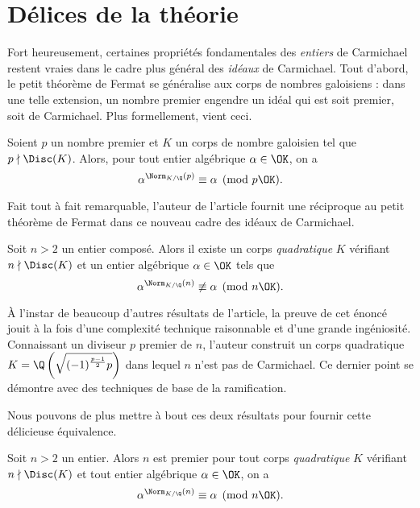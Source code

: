 \section{Délices de la théorie}

Fort heureusement, certaines propriétés fondamentales des \emph{entiers} de Carmichael restent vraies dans le cadre plus général des \emph{idéaux} de Carmichael. Tout d'abord, le petit théorème de Fermat se généralise aux corps de nombres galoisiens : dans une telle extension, un nombre premier engendre un idéal qui est soit premier, soit de Carmichael. Plus formellement, vient ceci.
\begin{theoreme}
	Soient $p$ un nombre premier et $K$ un corps de nombre galoisien tel que $p\nmid \Disc(K)$. Alors, pour tout entier algébrique $\alpha \in \OK$, on a $$\alpha^{\Norm_{K/\Q}(p)} \equiv \alpha \pmod{p\OK}.$$
\end{theoreme}

Fait tout à fait remarquable, l'auteur de l'article fournit une réciproque au petit théorème de Fermat dans ce nouveau cadre des idéaux de Carmichael.

\begin{theoreme}
	Soit $n>2$ un entier composé. Alors il existe un corps \emph{quadratique} $K$ vérifiant $n\nmid \Disc(K)$ et un entier algébrique $\alpha \in \OK$ tels que $$\alpha^{\Norm_{K/\Q}(n)} \not\equiv \alpha \pmod{n\OK}.$$
\end{theoreme}

\begin{MotSurPreuve}
	À l'instar de beaucoup d'autres résultats de l'article, la preuve de cet énoncé jouit à la fois d'une complexité technique raisonnable et d'une grande ingéniosité. Connaissant un diviseur $p$ premier de $n$, l'auteur construit un corps quadratique $K = \Q\left(\sqrt{(-1)^\frac{p-1}{2} p}\right)$ dans lequel $n$ n'est pas de Carmichael. Ce dernier point se démontre avec des techniques de base de la ramification. \\
\end{MotSurPreuve}

Nous pouvons de plus mettre à bout ces deux résultats pour fournir cette délicieuse équivalence.

\begin{theoreme}\label{ptf—reciproque}
	Soit $n>2$ un entier. Alors $n$ est premier \ssi pour tout corps \emph{quadratique} $K$ vérifiant $n\nmid \Disc(K)$ et tout entier algébrique $\alpha \in \OK$, on a $$\alpha^{\Norm_{K/\Q}(n)} \equiv \alpha \pmod{n\OK}.$$
\end{theoreme}


